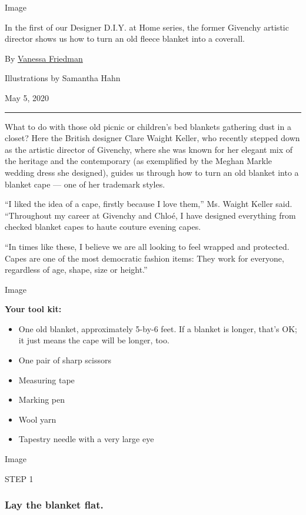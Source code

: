 Image

In the first of our Designer D.I.Y. at Home series, the former Givenchy
artistic director shows us how to turn an old fleece blanket into a
coverall.

By \href{https://www.nytimes3xbfgragh.onion/by/vanessa-friedman}{Vanessa
Friedman}

Illustrations by Samantha Hahn

May 5, 2020

\begin{center}\rule{0.5\linewidth}{\linethickness}\end{center}

What to do with those old picnic or children's bed blankets gathering
dust in a closet? Here the British designer Clare Waight Keller, who
recently stepped down as the artistic director of Givenchy, where she
was known for her elegant mix of the heritage and the contemporary (as
exemplified by the Meghan Markle wedding dress she designed), guides us
through how to turn an old blanket into a blanket cape --- one of her
trademark styles.

``I liked the idea of a cape, firstly because I love them,'' Ms. Waight
Keller said. ``Throughout my career at Givenchy and Chloé, I have
designed everything from checked blanket capes to haute couture evening
capes.

``In times like these, I believe we are all looking to feel wrapped and
protected. Capes are one of the most democratic fashion items: They work
for everyone, regardless of age, shape, size or height.''

Image

\textbf{Your tool kit:}

\begin{itemize}
\item
  One old blanket, approximately 5-by-6 feet. If a blanket is longer,
  that's OK; it just means the cape will be longer, too.
\item
  One pair of sharp scissors
\item
  Measuring tape
\item
  Marking pen
\item
  Wool yarn
\item
  Tapestry needle with a very large eye
\end{itemize}

Image

STEP 1

\hypertarget{lay-the-blanket-flat}{%
\subsubsection{\texorpdfstring{\textbf{Lay the blanket
flat.}}{Lay the blanket flat.}}\label{lay-the-blanket-flat}}


